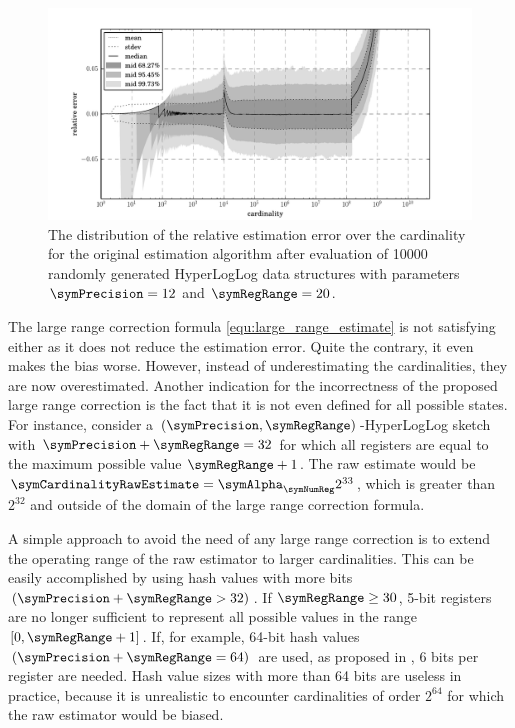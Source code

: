 \documentclass[a4paper]{scrartcl}
\begin{document}
\begin{figure}
\centering
\includegraphics[width=1\textwidth]{original_estimate}
\caption{The distribution of the relative estimation error over the cardinality for the original estimation algorithm after evaluation of \num{10000} randomly generated HyperLogLog data structures with parameters $\symPrecision = 12$ and $\symRegRange=20$.}
\label{fig:original_estimate}
\end{figure}

The large range correction formula \eqref{equ:large_range_estimate} is not satisfying either as it does not reduce the estimation error. Quite the contrary, it even makes the bias worse. However, instead of underestimating the cardinalities, they are now overestimated. Another indication for the incorrectness of the proposed large range correction is the fact that it is not even defined for all possible states. For instance, consider a $(\symPrecision,\symRegRange)$-HyperLogLog sketch with $\symPrecision+\symRegRange=32$ for which all registers are equal to the maximum possible value $\symRegRange+1$. The raw estimate would be $\symCardinalityRawEstimate = \symAlpha_\symNumReg 2^{33}$, which is greater than $2^{32}$ and outside of the domain of the large range correction formula.

A simple approach to avoid the need of any large range correction is to extend the operating range of the raw estimator to larger cardinalities. This can be easily accomplished by using hash values with more bits $(\symPrecision+\symRegRange>32)$. If $\symRegRange \geq 30$, 5-bit registers are no longer sufficient to represent all possible values in the range $[0, \symRegRange+1]$. If, for example, 64-bit hash values $(\symPrecision+\symRegRange=64)$ are used, as proposed in \cite{Heule2013}, 6 bits per register are needed. Hash value sizes with more than 64 bits are useless in practice, because it is unrealistic to encounter cardinalities of order $2^{64}$ for which the raw estimator would be biased.
\end{document}
